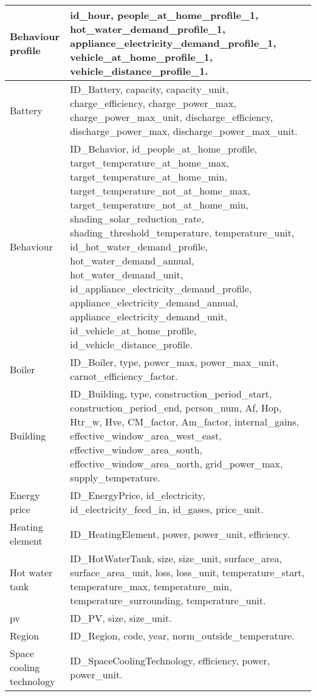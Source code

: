 \begin{center}
\begin{longtable}{ | p{} | p{} | }
            Behaviour profile & id\_hour, people\_at\_home\_profile\_1, hot\_water\_demand\_profile\_1, appliance\_electricity\_demand\_profile\_1, vehicle\_at\_home\_profile\_1, vehicle\_distance\_profile\_1. \\
            \hline 
            Battery & ID\_Battery, capacity, capacity\_unit, charge\_efficiency, charge\_power\_max, charge\_power\_max\_unit, discharge\_efficiency, discharge\_power\_max, discharge\_power\_max\_unit. \\
            \hline 
            Behaviour & ID\_Behavior, id\_people\_at\_home\_profile, target\_temperature\_at\_home\_max, target\_temperature\_at\_home\_min, target\_temperature\_not\_at\_home\_max, target\_temperature\_not\_at\_home\_min, shading\_solar\_reduction\_rate, shading\_threshold\_temperature, temperature\_unit, id\_hot\_water\_demand\_profile, hot\_water\_demand\_annual, hot\_water\_demand\_unit, id\_appliance\_electricity\_demand\_profile, appliance\_electricity\_demand\_annual, appliance\_electricity\_demand\_unit, id\_vehicle\_at\_home\_profile, id\_vehicle\_distance\_profile. \\
            \hline 
            Boiler & ID\_Boiler, type, power\_max, power\_max\_unit, carnot\_efficiency\_factor. \\
            \hline 
            Building & ID\_Building, type, construction\_period\_start, construction\_period\_end, person\_num, Af, Hop, Htr\_w, Hve, CM\_factor, Am\_factor, internal\_gains, effective\_window\_area\_west\_east, effective\_window\_area\_south, effective\_window\_area\_north, grid\_power\_max, supply\_temperature. \\
            \hline
            Energy price & ID\_EnergyPrice, id\_electricity, id\_electricity\_feed\_in, id\_gases, price\_unit. \\
            \hline
            Heating element & ID\_HeatingElement, power, power\_unit, efficiency. \\
            \hline 
            Hot water tank & ID\_HotWaterTank, size, size\_unit, surface\_area, surface\_area\_unit, loss, loss\_unit, temperature\_start, temperature\_max, temperature\_min, temperature\_surrounding, temperature\_unit. \\
            \hline 
            \gls{pv} & ID\_PV, size, size\_unit. \\
            \hline
            Region & ID\_Region, code, year, norm\_outside\_temperature. \\
            \hline 
            Space cooling technology & ID\_SpaceCoolingTechnology, efficiency, power, power\_unit. \\

\end{longtable}
\end{center}
